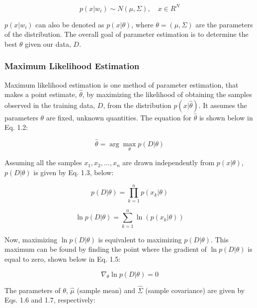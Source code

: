 \documentclass{article}
\begin{document}
\begin{equation}
p(x|w_{i}) \sim N(\mu, \Sigma), \quad x \in R^{N}
\label{eq:1.1}
\end{equation}

$p(x|w_{i})$ can also be denoted as $p(x|\theta)$, where
$\theta = (\mu, \Sigma)$ are the parameters of the distribution. The
overall goal of parameter estimation is to determine the best $\theta$
given our data, $D$.

\subsubsection*{Maximum Likelihood Estimation}\label{maximum-likelihood-estimation}

Maximum likelihood estimation is one method of parameter estimation,
that makes a point estimate, $\widehat{\theta}$, by maximizing the
likelihood of obtaining the samples observed in the training data, $D$,
from the distribution $p(x|\widehat{\theta})$. It assumes the
parameters $\theta$ are fixed, unknown quantities. The equation for
$\widehat{\theta}$ is shown below in Eq. 1.2:

\begin{equation}
\widehat{\theta} = \arg\max_{\theta} p(D|\theta)
\label{eq:1.2}
\end{equation}

Assuming all the samples $x_{1}, x_{2}, \dots, x_{n}$ are drawn
independently from $p(x|\theta)$, $p(D|\theta)$ is given by Eq. 1.3,
below:

\begin{equation}
p(D|\theta) = \prod_{k=1}^{n} p(x_{k}|\theta)
\label{eq:1.3}
\end{equation}

\begin{equation}
\ln p(D|\theta) = \sum_{k=1}^{n} \ln(p(x_{k}|\theta))
\label{eq:1.4}
\end{equation}

Now, maximizing $\ln p(D|\theta)$ is equivalent to maximizing
$p(D|\theta)$. This maximum can be found by finding the point where
the gradient of $\ln p(D|\theta)$ is equal to zero, shown below in Eq. 1.5:

\begin{equation}
\nabla_{\theta}\ln p(D|\theta) = 0
\label{eq:1.5}
\end{equation}

The parameters of $\theta$, $\widehat{\mu}$ (sample mean) and
$\widehat{\Sigma}$ (sample covariance) are given by Eqs. 1.6 and 1.7,
respectively:
\end{document}
